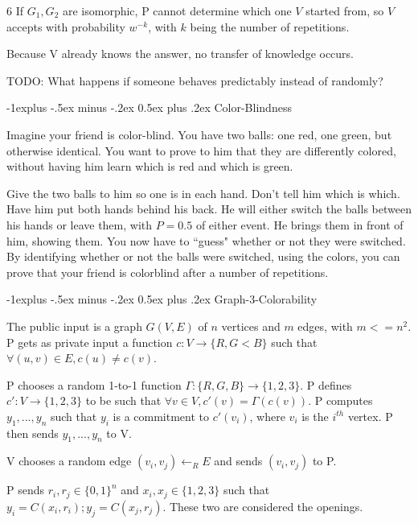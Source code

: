 \documentclass[2pt]{scrartcl}
\makeatletter
\renewcommand{\subsection}{\@startsection{subsection}{2}{0mm}
  {-1explus -.5ex minus -.2ex}
  {0.5ex plus .2ex}
{\normalfont\normalsize\bfseries}}
\makeatother
\begin{document}
\begin{multicols}{6}
  If $G_1, G_2$ are isomorphic, P cannot determine which one $V$ started from, so $V$ accepts with probability $w^{-k}$, with $k$ being the number of repetitions.

  Because V already knows the answer, no transfer of knowledge occurs.

  TODO: What happens if someone behaves predictably instead of randomly?

  \subsection{Color-Blindness}

  Imagine your friend is color-blind. You have two balls: one red, one green, but otherwise identical. You want to prove to him that they are differently colored, without having him learn which is red and which is green.

  Give the two balls to him so one is in each hand. Don't tell him which is which. Have him put both hands behind his back. He will either switch the balls between his hands or leave them, with $P = 0.5$ of either event. He brings them in front of him, showing them. You now have to ``guess" whether or not they were switched. By identifying whether or not the balls were switched, using the colors, you can prove that your friend is colorblind after a number of repetitions.

  \subsection{Graph-3-Colorability}

  The public input is a graph $G(V, E)$ of $n$ vertices and $m$ edges, with $m <= n^2$. P gets as private input a function $c: V \rightarrow \{R, G< B\}$ such that $\forall (u, v) \in E, c(u) \neq c(v)$.

  P chooses a random 1-to-1 function $\Gamma: \{R, G, B\} \rightarrow \{1, 2, 3\}$. P defines $c': V \rightarrow \{1, 2, 3\}$ to be such that $\forall v \in V, c'(v) = \Gamma(c(v))$. P computes $y_1, ..., y_n$ such that $y_i$ is a commitment to $c'(v_i)$, where $v_i$ is the $i^{th}$ vertex. P then sends $y_1, ..., y_n$ to V.

  V chooses a random edge $(v_i, v_j) \leftarrow_R E$ and sends $(v_i, v_j)$ to P.

  P sends $r_i, r_j \in \{0, 1\}^n$ and $x_i, x_j \in \{1, 2, 3\}$ such that $y_i = C(x_i, r_i); y_j = C(x_j, r_j)$. These two are considered the openings.


\end{multicols}
\end{document}
